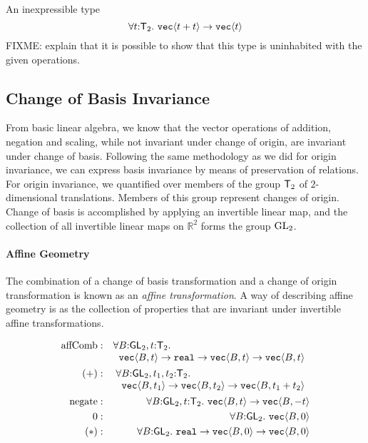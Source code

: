 \begin{example}
  An inexpressible type
  \begin{displaymath}
    \forall t \mathord: \mathsf{T}_2.\ \texttt{vec}\langle t + t \rangle \to \texttt{vec}\langle t \rangle
  \end{displaymath}
  FIXME: explain that it is possible to show that this type is
  uninhabited with the given operations.
\end{example}

\subsection{Change of Basis Invariance}
\label{sec:motivation-generalising}

From basic linear algebra, we know that the vector operations of
addition, negation and scaling, while not invariant under change of
origin, are invariant under change of basis. Following the same
methodology as we did for origin invariance, we can express basis
invariance by means of preservation of relations. For origin
invariance, we quantified over members of the group $\mathsf{T}_2$ of
$2$-dimensional translations. Members of this group represent changes
of origin. Change of basis is accomplished by applying an invertible
linear map, and the collection of all invertible linear maps on
$\mathbb{R}^2$ forms the group $\mathrm{GL}_2$.


\paragraph{Affine Geometry} The combination of a change of basis
transformation and a change of origin transformation is known as an
\emph{affine transformation}. A way of describing affine geometry is
as the collection of properties that are invariant under invertible
affine transformations.

\begin{eqnarray*}
  \mathrm{affComb} & : &
  \begin{array}[t]{@{}l}
    \forall B \mathord: \SynGL_2, t \mathord: \SynTransl_2.\\
    \hspace{0.2cm} \tyPrim{vec}{B,t} \to \tyPrimNm{real} \to \tyPrim{vec}{B,t} \to \tyPrim{vec}{B,t}
  \end{array}
  \\
  (+) & : &
  \begin{array}[t]{@{}l}
    \forall B \mathord: \SynGL_2, t_1,t_2 \mathord: \SynTransl_2. \\
    \hspace{0.2cm}\tyPrim{vec}{B,t_1} \to \tyPrim{vec}{B,t_2} \to \tyPrim{vec}{B,t_1 + t_2}
  \end{array}
  \\
  \mathrm{negate} & : & \forall B \mathord: \SynGL_2, t \mathord: \SynTransl_2.\ \tyPrim{vec}{B,t} \to \tyPrim{vec}{B,-t} \\
  0 & : & \forall B \mathord: \SynGL_2.\ \tyPrim{vec}{B,0} \\
  (*) & : & \forall B \mathord: \SynGL_2.\ \tyPrimNm{real} \to \tyPrim{vec}{B,0} \to \tyPrim{vec}{B,0}
\end{eqnarray*}

